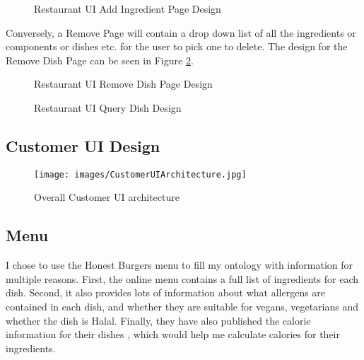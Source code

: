 \begin{figure}[h]
    \centering
    \captionsetup{justification=centering}
    \caption{Restaurant UI Add Ingredient Page Design}
    \label{fig:restaurantUI_add_page_design}
\end{figure}

Conversely, a Remove Page will contain a drop down list of all the ingredients or components or dishes etc. for the user to pick one to delete. The design for the Remove Dish Page can be seen in Figure \ref{fig:restaurantUI_remove_page_design}.

\begin{figure}[h]
    \centering
    \captionsetup{justification=centering}
    \caption{Restaurant UI Remove Dish Page Design}
    \label{fig:restaurantUI_remove_page_design}
\end{figure}



\begin{figure}[h]
    \centering
    \captionsetup{justification=centering}
    \caption{Restaurant UI Query Dish Design}
    \label{fig:restaurantUI_query_page_design}
\end{figure}

\subsection{Customer UI Design}

\begin{figure}[h]
    \centering
    \captionsetup{justification=centering}
    \texttt{[image: images/CustomerUIArchitecture.jpg]}
    \caption{Overall Customer UI architecture}
    \label{fig:customerUI_architecture}
\end{figure}

\subsection{Menu}

I chose to use the Honest Burgers \cite{honest_burgers_2023} menu to fill my ontology with information for multiple reasons. First, the online menu contains a full list of ingredients for each dish. Second, it also provides lots of information about what allergens are contained in each dish, and whether they are suitable for vegans, vegetarians and whether the dish is Halal. Finally, they have also published the calorie information for their dishes \cite{honest_burgers_nutritional_2022}, which would help me calculate calories for their ingredients.

